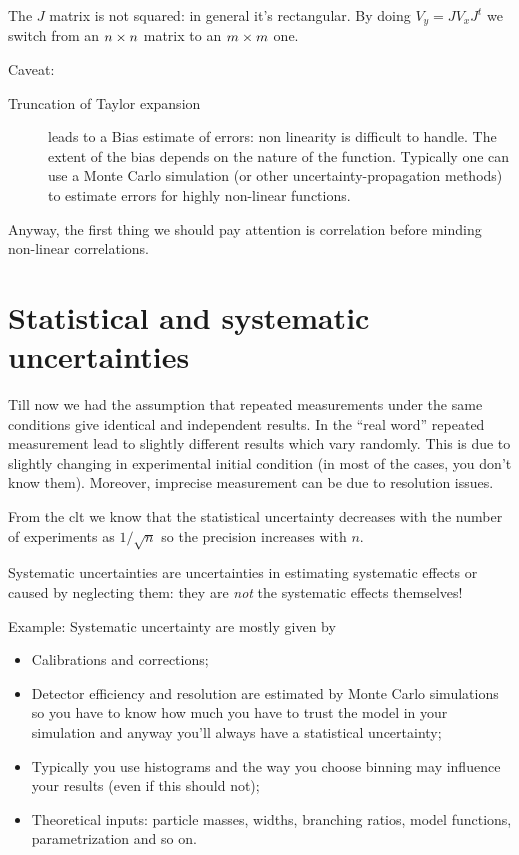 \documentclass[
	10pt,
	draft
]{scrreprt}
\begin{document}
The $J$ matrix is not squared: in general it's rectangular.
By doing $V_y = JV_xJ^t$ we switch from an $n\times n$ matrix to an $m\times m$ one.

Caveat:
\begin{description}
\item[Truncation of Taylor expansion] leads to a Bias estimate of errors: non linearity is difficult to handle.
The extent of the bias depends on the nature of the function.
Typically one can use a Monte Carlo simulation (or other uncertainty-propagation methods) to estimate errors for highly non-linear functions.
\end{description}

Anyway, the first thing we should pay attention is correlation before minding non-linear correlations.

	\section{Statistical and systematic uncertainties}

Till now we had the assumption that repeated measurements under the same conditions give identical and independent results.
In the ``real word'' repeated measurement lead to slightly different results which vary randomly.
This is due to slightly changing in experimental initial condition (in most of the cases, you don't know them).
Moreover, imprecise measurement can be due to resolution issues.


From the \ac{clt} we know that the statistical uncertainty decreases with the number of experiments as $1/\sqrt{n}$ so the precision increases with $n$.


Systematic uncertainties are uncertainties in estimating systematic effects or caused by neglecting them: they are \emph{not} the systematic effects themselves!


Example: Systematic uncertainty are mostly given by

\begin{itemize}
	\item
Calibrations and corrections;
	\item
Detector efficiency and resolution are estimated by Monte Carlo simulations so you have to know how much you have to trust the model in your simulation and anyway you'll always have a statistical uncertainty;
	\item
Typically you use histograms and the way you choose binning may influence your results (even if this should not);
	\item
Theoretical inputs: particle masses, widths, branching ratios, model functions, parametrization and so on.
\end{itemize}
\end{document}
